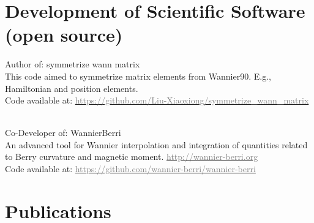 \documentclass[12pt,a4paper,sans]{moderncv} %
\begin{document}
\section{Development of Scientific Software (open source)}
{\textcolor{cvblue}{\large Author of: symmetrize wann matrix}\\
This code aimed to symmetrize matrix elements from Wannier90. E.g., Hamiltonian and position elements.\\
Code available at: \href{https://github.com/Liu-Xiaoxiong/symmetrize_wann_matrix}{\textcolor{gray}{https://github.com/Liu-Xiaoxiong/symmetrize\_wann\_matrix}} \\
~\\
{\textcolor{cvblue}{\large Co-Developer of: WannierBerri}\\
An advanced tool for Wannier interpolation and integration of quantities related to Berry curvature and magnetic moment. \href{http://wannier-berri.org}{\textcolor{gray}{http://wannier-berri.org}}\\
Code available at: \href{https://github.com/wannier-berri/wannier-berri}{\textcolor{gray}{https://github.com/wannier-berri/wannier-berri}} 


\newpage

\section{Publications}

}}
\end{document}
